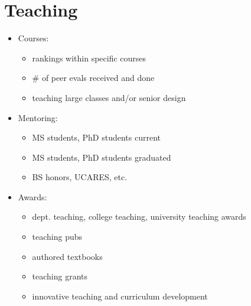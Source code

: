 \documentclass[11pt]{article}
\begin{document}
\section{Teaching}
\begin{itemize}
\item Courses:
  \begin{itemize}
  \item rankings within specific courses
  \item \# of peer evals received and done
  \item teaching large classes and/or senior design
  \end{itemize}
\item Mentoring:
  \begin{itemize}
  \item MS students, PhD students current
  \item MS students, PhD students graduated
  \item BS honors, UCARES, etc.
  \end{itemize}
\item Awards:
  \begin{itemize}
  \item dept. teaching, college teaching, university teaching awards
  \item teaching pubs
  \item authored textbooks
  \item teaching grants
  \item innovative teaching and curriculum development
  \end{itemize}
\end{itemize}

\end{document}
